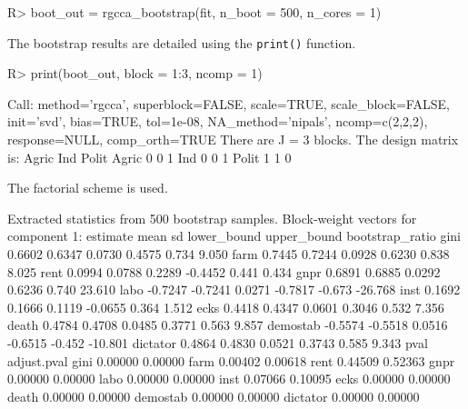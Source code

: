 \documentclass[
]{jss}
\begin{document}
\footnotesize

\begin{CodeChunk}
\begin{CodeInput}
R> boot_out = rgcca_bootstrap(fit, n_boot = 500, n_cores = 1)
\end{CodeInput}
\end{CodeChunk}

\normalsize

The bootstrap results are detailed using the \texttt{print()} function.

\footnotesize

\begin{CodeChunk}
\begin{CodeInput}
R> print(boot_out, block = 1:3, ncomp = 1)
\end{CodeInput}
\begin{CodeOutput}
Call: method='rgcca', superblock=FALSE, scale=TRUE, scale_block=FALSE, init='svd',
bias=TRUE, tol=1e-08, NA_method='nipals', ncomp=c(2,2,2), response=NULL,
comp_orth=TRUE 
There are J = 3 blocks.
The design matrix is:
      Agric Ind Polit
Agric     0   0     1
Ind       0   0     1
Polit     1   1     0

The factorial scheme is used.

Extracted statistics from 500 bootstrap samples.
Block-weight vectors for component 1: 
         estimate    mean     sd lower_bound upper_bound bootstrap_ratio
gini       0.6602  0.6347 0.0730      0.4575       0.734           9.050
farm       0.7445  0.7244 0.0928      0.6230       0.838           8.025
rent       0.0994  0.0788 0.2289     -0.4452       0.441           0.434
gnpr       0.6891  0.6885 0.0292      0.6236       0.740          23.610
labo      -0.7247 -0.7241 0.0271     -0.7817      -0.673         -26.768
inst       0.1692  0.1666 0.1119     -0.0655       0.364           1.512
ecks       0.4418  0.4347 0.0601      0.3046       0.532           7.356
death      0.4784  0.4708 0.0485      0.3771       0.563           9.857
demostab  -0.5574 -0.5518 0.0516     -0.6515      -0.452         -10.801
dictator   0.4864  0.4830 0.0521      0.3743       0.585           9.343
            pval adjust.pval
gini     0.00000     0.00000
farm     0.00402     0.00618
rent     0.44509     0.52363
gnpr     0.00000     0.00000
labo     0.00000     0.00000
inst     0.07066     0.10095
ecks     0.00000     0.00000
death    0.00000     0.00000
demostab 0.00000     0.00000
dictator 0.00000     0.00000
\end{CodeOutput}
\end{CodeChunk}
\end{document}

